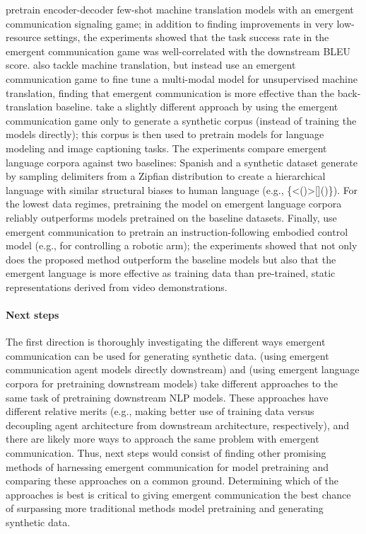 \citet{Li2020EmergentCP} pretrain encoder-decoder few-shot machine translation models with an emergent communication signaling game;
  in addition to finding improvements in very low-resource settings, the experiments showed that the task success rate in the emergent communication game was well-correlated with the downstream BLEU score.
\citet{downey2022learning} also tackle machine translation, but instead use an emergent communication game to fine tune a multi-modal model for unsupervised machine translation, finding that emergent communication is more effective than the back-translation baseline.
\citet{yao2022linking} take a slightly different approach by using the emergent communication game only to generate a synthetic corpus (instead of training the models directly);
  this corpus is then used to pretrain models for language modeling and image captioning tasks.
The experiments compare emergent language corpora against two baselines:
  Spanish
  and a synthetic dataset generate by sampling delimiters from a Zipfian distribution to create a hierarchical language with similar structural biases to human language (e.g., {\small\ttfamily \{<()>[]()\}}).
For the lowest data regimes, pretraining the model on emergent language corpora reliably outperforms models pretrained on the baseline datasets.
Finally, \citet{mu2023ec} use emergent communication to pretrain an instruction-following embodied control model (e.g., for controlling a robotic arm);
  the experiments showed that not only does the proposed method outperform the baseline models but also that the emergent language is more effective as training data than pre-trained, static representations derived from video demonstrations.

\paragraph{Next steps}
The first direction is thoroughly investigating the different ways emergent communication can be used for generating synthetic data.
\citet{Li2020EmergentCP} (using emergent communication agent models directly downstream) and \citet{yao2022linking} (using emergent language corpora for pretraining downstream models) take different approaches to the same task of pretraining downstream NLP models.
These approaches have different relative merits (e.g., making better use of training data versus decoupling agent architecture from downstream architecture, respectively), and there are likely more ways to approach the same problem with emergent communication.
Thus, next steps would consist of finding other promising methods of harnessing emergent communication for model pretraining and comparing these approaches on a common ground.
Determining which of the approaches is best is critical to giving emergent communication the best chance of surpassing more traditional methods model pretraining and generating synthetic data.

